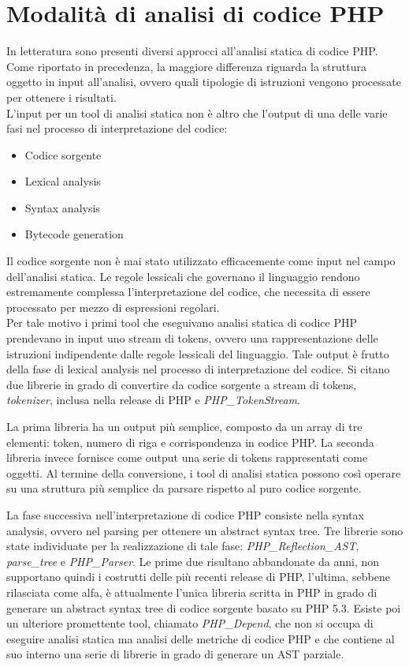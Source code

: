 \section{Modalità di analisi di codice PHP}
In letteratura sono presenti diversi approcci all'analisi statica di codice PHP. Come riportato in precedenza, la maggiore differenza riguarda la struttura oggetto in input all'analisi, ovvero quali tipologie di istruzioni vengono processate per ottenere i risultati.\\
L'input per un tool di analisi statica non è altro che l'output di una delle varie fasi nel processo di interpretazione del codice:
\begin{itemize}
\item Codice sorgente
\item Lexical analysis
\item Syntax analysis
\item Bytecode generation
\end{itemize}
Il codice sorgente non è mai stato utilizzato efficacemente come input nel campo dell'analisi statica. Le regole lessicali che governano il linguaggio rendono estremamente complessa l'interpretazione del codice, che necessita di essere processato per mezzo di espressioni regolari.\\
Per tale motivo i primi tool che eseguivano analisi statica di codice PHP prendevano in input uno stream di tokens, ovvero una rappresentazione delle istruzioni indipendente dalle regole lessicali del linguaggio. Tale output è frutto della fase di lexical analysis nel processo di interpretazione del codice.
Si citano due librerie in grado di convertire da codice sorgente a stream di tokens, \emph{tokenizer}, inclusa nella release di PHP e \emph{PHP\_TokenStream}.

\cite{ESEMPIO TOKENIZER}
\cite{ESEMPIO TOKENSTREAM}

La prima libreria ha un output più semplice, composto da un array di tre elementi: token, numero di riga e corrispondenza in codice PHP. La seconda libreria invece fornisce come output una serie di tokens rappresentati come oggetti.
Al termine della conversione, i tool di analisi statica possono così operare su una struttura più semplice da parsare rispetto al puro codice sorgente.

La fase successiva nell'interpretazione di codice PHP consiste nella syntax analysis, ovvero nel parsing per ottenere un abstract syntax tree. Tre librerie sono state individuate per la realizzazione di tale fase: \emph{PHP\_Reflection\_AST}, \emph{parse\_tree} e \emph{PHP\_Parser}. Le prime due risultano abbandonate da anni, non supportano quindi i costrutti delle più recenti release di PHP, l'ultima, sebbene rilasciata come alfa, è attualmente l'unica libreria scritta in PHP in grado di generare un abstract syntax tree di codice sorgente basato su PHP 5.3. Esiste poi un ulteriore promettente tool, chiamato \emph{PHP\_Depend}, che non si occupa di eseguire analisi statica ma analisi delle metriche di codice PHP e che contiene al suo interno una serie di librerie in grado di generare un AST parziale.

